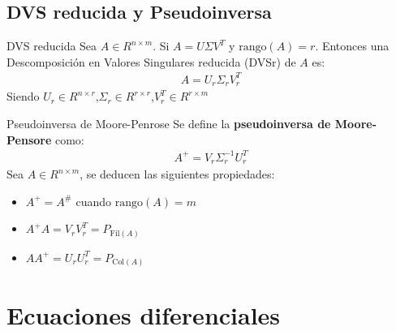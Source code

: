 \documentclass[a4paper, twoside]{article}
\numberwithin{equation}{section}
\numberwithin{figure}{section}
\numberwithin{table}{section}
\newcommand{\fil}[1]{\text{Fil}(#1)}
\newcommand{\col}[1]{\text{Col}(#1)}
\newcommand{\rg}[1]{\text{rango}\left(#1\right)}
\begin{document}
\subsection{DVS reducida y Pseudoinversa}
\begin{definicion*}{DVS reducida}
	Sea $A \in R^{n \times m}$. Si $A=U\Sigma V^T$ y $\rg{A}=r$. Entonces una Descomposición en Valores Singulares reducida (DVSr) de $A$ es:
	\begin{align}
		A=U_r \Sigma_r V_r^T
	\end{align}
	Siendo $U_r \in R^{n \times r}$,$\Sigma_r \in R^{r \times r}$,$V_r^T \in R^{r \times m}$
\end{definicion*}

\begin{definicion*}{Pseudoinversa de Moore-Penrose}
	Se define la \textbf{pseudoinversa de Moore-Pensore} como:
	\begin{align}
		A^+=V_r \Sigma_r^{-1}U_r^T
	\end{align}
	Sea $A \in R^{n \times m}$, se deducen las siguientes propiedades:
	\begin{itemize}
		\item $A^+=A^{\#}$ cuando $\rg{A}=m$
		\item $A^+ A=V_r V_r^T=P_{\fil{A}}$
		\item $A A^+=U_r U_r^T=P_{\col{A}}$
	\end{itemize}
\end{definicion*}

\newpage
\section{Ecuaciones diferenciales}
\end{document}
